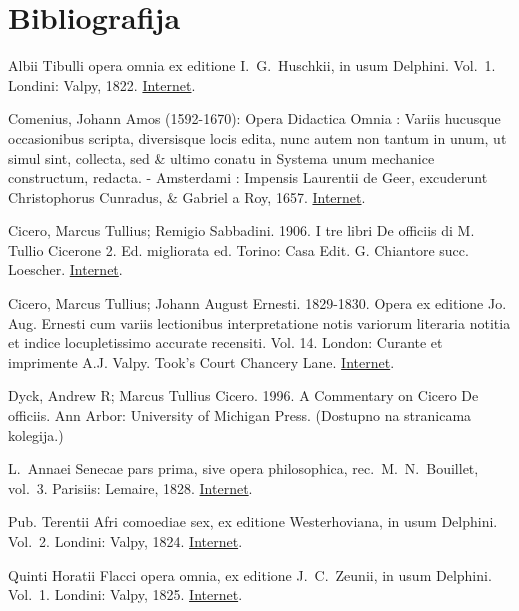 \documentclass[a4paper,12pt,twoside]{book}
\begin{document}
\section*{Bibliografija}

{
\setlength{\parindent}{0pt}

Albii Tibulli opera omnia ex editione I.\ G.\ Huschkii, in usum Delphini. Vol.\ 1. Londini: Valpy, 1822. \href{https://archive.org/details/delphinclassics173valp}{Internet}.

Comenius, Johann Amos (1592-1670): Opera Didactica Omnia : Variis hucusque occasionibus scripta, diversisque locis edita, nunc autem non tantum in unum, ut simul sint, collecta, sed \& ultimo conatu in Systema unum mechanice constructum, redacta. - Amsterdami : Impensis Laurentii de Geer, excuderunt Christophorus Cunradus, \& Gabriel a Roy, 1657. \href{http://mateo.uni-mannheim.de/camenaref/comenius.html}{Internet}.

Cicero, Marcus Tullius; Remigio Sabbadini. 1906. I tre libri De officiis di M. Tullio Cicerone 2. Ed. migliorata ed. Torino: Casa Edit. G. Chiantore succ. Loescher. \href{https://archive.org/details/ITreLibriDeOfficiisDiM.TullioCicerone.CommentatiDaRemigioSabbadini}{Internet}.

Cicero, Marcus Tullius; Johann August Ernesti. 1829-1830. Opera ex editione Jo. Aug. Ernesti cum variis lectionibus interpretatione notis variorum literaria notitia et indice locupletissimo accurate recensiti. Vol. 14. London: Curante et imprimente A.J. Valpy. Took's Court Chancery Lane. \href{https://archive.org/details/vol14operaexedit00cice}{Internet}.

Dyck, Andrew R; Marcus Tullius Cicero. 1996. A Commentary on Cicero De officiis. Ann Arbor: University of Michigan Press. (Dostupno na stranicama kolegija.)


L.\ Annaei Senecae pars prima, sive opera philosophica, rec.\ M.\ N.\ Bouillet, vol.\ 3. Parisiis: Lemaire, 1828. \href{https://archive.org/details/lannsenecparspr03bouigoog}{Internet}.

Pub. Terentii Afri comoediae sex, ex editione Westerhoviana, in usum Delphini. Vol.\ 2. Londini: Valpy, 1824. \href{https://archive.org/details/pubterentiiafric02tereuoft}{Internet}.

Quinti Horatii Flacci opera omnia, ex editione J.\ C.\ Zeunii, in usum Delphini. Vol.\ 1.  Londini: Valpy, 1825. \href{https://archive.org/details/delphinclassics57valp}{Internet}.

}
\end{document}

